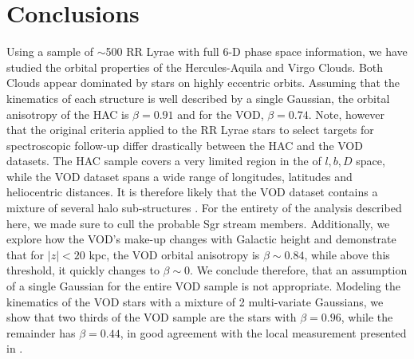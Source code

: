 \documentclass[fleqn,usenatbib]{mnras}
\begin{document}
\section{Conclusions}

Using a sample of $\sim$500 RR Lyrae with full 6-D phase space
information, we have studied the orbital properties of the
Hercules-Aquila and Virgo Clouds. Both Clouds appear dominated by
stars on highly eccentric orbits. Assuming that the kinematics of each
structure is well described by a single Gaussian, the orbital
anisotropy of the HAC is $\beta=0.91$ and for the VOD,
$\beta=0.74$. Note, however that the original criteria applied to the
RR Lyrae stars to select targets for spectroscopic follow-up differ
drastically between the HAC and the VOD datasets. The HAC sample
covers a very limited region in the of $l,b, D$ space, while the VOD
dataset spans a wide range of longitudes, latitudes and heliocentric
distances. It is therefore likely that the VOD dataset contains a
mixture of several halo sub-structures \citep[see][for a detailed
  discussion]{Vivas2016}. For the entirety of the analysis described
here, we made sure to cull the probable Sgr stream
members. Additionally, we explore how the VOD's make-up changes with
Galactic height and demonstrate that for $|z|<20$ kpc, the VOD orbital
anisotropy is $\beta\sim 0.84$, while above this threshold, it quickly
changes to $\beta\sim0$. We conclude therefore, that an assumption of
a single Gaussian for the entire VOD sample is not
appropriate. Modeling the kinematics of the VOD stars with a mixture
of 2 multi-variate Gaussians, we show that two thirds of the VOD
sample are the stars with $\beta=0.96$, while the remainder has
$\beta=0.44$, in good agreement with the local measurement presented
in \citet{Belokurov2018}.
\end{document}

